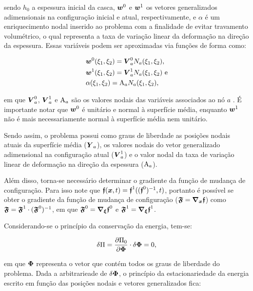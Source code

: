 \noindent sendo $h_0$ a espessura inicial da casca, $\boldsymbol{w}^0$ e $\boldsymbol{w}^1$ os vetores generalizados adimensionais na configuração inicial e atual, respectivamente, e $\alpha$ é um enriquecimento nodal inserido ao problema com a finalidade de evitar travamento volumétrico, o qual representa a taxa de variação linear da deformação na direção da espessura. Essas variáveis podem ser aproximadas via funções de forma como:

\begin{subequations}
    \begin{align}
         & \boldsymbol{w}^0(\xi_1,\xi_2)=\boldsymbol{V}^0_aN_a(\xi_1,\xi_2)\text{,}  \\
         & \boldsymbol{w}^1(\xi_1,\xi_2)=\boldsymbol{V}^1_aN_a(\xi_1,\xi_2)\text{ e} \\
         & \alpha(\xi_1,\xi_2)=\mathrm{A}_aN_a(\xi_1,\xi_2)\text{,}
    \end{align}
\end{subequations}

\noindent em que $\boldsymbol{V}^0_a$, $\boldsymbol{V}^1_a$ e $\mathrm{A}_a$ são os valores nodais das variáveis associados ao nó $a$ \cite{sanches2013unconstrained,sanches2014fluid}. É importante notar que $\boldsymbol{w}^0$ é unitário e normal à superfície média, enquanto $\boldsymbol{w}^1$ não é mais necessariamente normal à superfície média nem unitário.

Sendo assim, o problema possui como graus de liberdade as posições nodais atuais da superfície média ($\boldsymbol{Y}_a$), os valores nodais do vetor generalizado adimensional na configuração atual ($\boldsymbol{V}^1_a$) e o valor nodal da taxa de variação linear de deformação na direção da espessura ($\mathrm{A}_a$).

Além disso, torna-se necessário determinar o gradiente da função de mudança de configuração. Para isso note que $\boldsymbol{\mathfrak{f}}(\boldsymbol{x},t)=\boldsymbol{\mathfrak{f}}^1((\boldsymbol{\mathfrak{f}}^0)^{-1},t)$, portanto é possível se obter o gradiente da função de mudança de configuração ($\boldsymbol{\mathfrak{F}}=\boldsymbol{\nabla_x}\boldsymbol{\mathfrak{f}}$) como $\boldsymbol{\mathfrak{F}}=\boldsymbol{\mathfrak{F}}^1\cdot(\boldsymbol{\mathfrak{F}}^0)^{-1}$, em que $\boldsymbol{\mathfrak{F}}^0=\boldsymbol{\nabla_\xi}\boldsymbol{\mathfrak{f}}^0$ e $\boldsymbol{\mathfrak{F}}^1=\boldsymbol{\nabla_\xi}\boldsymbol{\mathfrak{f}}^1$.

Considerando-se o princípio da conservação da energia, tem-se:

\begin{equation}
    \delta\Pi=\frac{\partial{\Pi_0}}{\partial{\boldsymbol{\Phi}}}\cdot\delta\boldsymbol{\Phi}=0\text{,}
\end{equation}

\noindent em que $\boldsymbol{\Phi}$ representa o vetor que contém todos os graus de liberdade do problema. Dada a arbitrarieade de $\delta\boldsymbol{\Phi}$, o princípio da estacionariedade da energia escrito em função das posições nodais e vetores generalizados fica:

